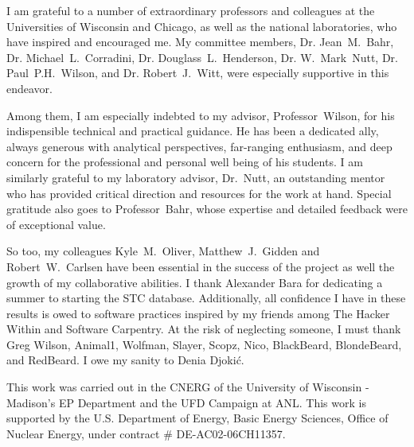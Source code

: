 I am grateful to a number of extraordinary professors and colleagues at the 
Universities of Wisconsin and Chicago, as well as the national laboratories, 
who have inspired and encouraged me. My committee members, Dr. Jean~M.~Bahr, Dr.  
Michael~L.~Corradini, Dr. Douglass~L.~Henderson, Dr. W.~Mark~Nutt, Dr.  
Paul~P.H.~Wilson, and Dr. Robert~J.~Witt, were especially supportive in this 
endeavor.  

Among them, I am especially indebted to my advisor, Professor~Wilson, 
for his indispensible technical and practical guidance. He has been a dedicated 
ally, always generous with analytical perspectives, far-ranging enthusiasm, 
and deep concern for the professional and personal well being of his students. 
I am similarly grateful to my laboratory advisor, Dr.~Nutt, an 
outstanding mentor who has provided critical direction and resources for the 
work at hand. Special gratitude also goes to Professor~Bahr, whose 
expertise and detailed feedback were of exceptional value.  

So too, my colleagues Kyle~M.~Oliver, Matthew~J.~Gidden and Robert~W.~Carlsen 
have been essential in the success of the \Cyclus project as well the growth of 
my collaborative abilities. I thank Alexander Bara for dedicating a summer to 
starting the STC database. Additionally, all confidence I have in 
these results is owed to software practices inspired by my friends among The 
Hacker Within and Software Carpentry. At the risk of neglecting someone, I must 
thank Greg Wilson, Animal1, Wolfman, Slayer, Scopz, Nico,  BlackBeard, 
BlondeBeard, and RedBeard. I owe my sanity to Denia Djoki\'{c}.

This work was carried out in the \gls{CNERG} of the University of Wisconsin - 
Madison's \gls{EP} Department and the \gls{UFD} Campaign at \gls{ANL}. This 
work is supported by the U.S. Department of Energy, Basic Energy Sciences, 
Office of Nuclear Energy, under contract \# DE-AC02-06CH11357.
